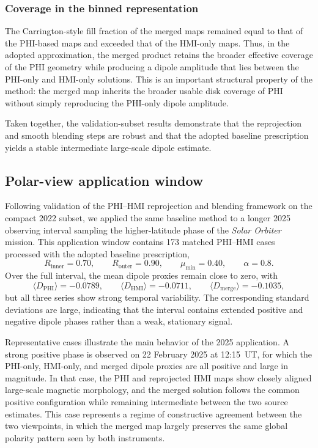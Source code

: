 \documentclass[namedreferences,hyperref,optionalrh]{spr-sola}
\begin{document}
\subsubsection{Coverage in the binned representation}

The Carrington-style fill fraction of the merged maps remained equal to that of the PHI-based maps and exceeded that of the HMI-only maps. Thus, in the adopted approximation, the merged product retains the broader effective coverage of the PHI geometry while producing a dipole amplitude that lies between the PHI-only and HMI-only solutions. This is an important structural property of the method: the merged map inherits the broader usable disk coverage of PHI without simply reproducing the PHI-only dipole amplitude.

Taken together, the validation-subset results demonstrate that the reprojection and smooth blending steps are robust and that the adopted baseline prescription yields a stable intermediate large-scale dipole estimate.

\subsection{Polar-view application window}


Following validation of the PHI--HMI reprojection and blending framework on the compact 2022 subset, we applied the same baseline method to a longer 2025 observing interval sampling the higher-latitude phase of the \textit{Solar Orbiter} mission. This application window contains 173 matched PHI--HMI cases processed with the adopted baseline prescription,
\[
R_{\mathrm{inner}} = 0.70,\qquad
R_{\mathrm{outer}} = 0.90,\qquad
\mu_{\min}=0.40,\qquad
\alpha = 0.8.
\]
Over the full interval, the mean dipole proxies remain close to zero, with
\[
\langle D_{\mathrm{PHI}} \rangle = -0.0789,\qquad
\langle D_{\mathrm{HMI}} \rangle = -0.0711,\qquad
\langle D_{\mathrm{merge}} \rangle = -0.1035,
\]
but all three series show strong temporal variability. The corresponding standard deviations are large, indicating that the interval contains extended positive and negative dipole phases rather than a weak, stationary signal.

Representative cases illustrate the main behavior of the 2025 application. A strong positive phase is observed on 22 February 2025 at 12:15~UT, for which the PHI-only, HMI-only, and merged dipole proxies are all positive and large in magnitude. In that case, the PHI and reprojected HMI maps show closely aligned large-scale magnetic morphology, and the merged solution follows the common positive configuration while remaining intermediate between the two source estimates. This case represents a regime of constructive agreement between the two viewpoints, in which the merged map largely preserves the same global polarity pattern seen by both instruments.
\end{document}
